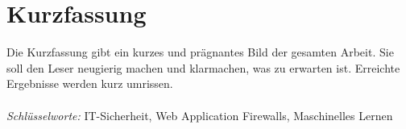 

\section*{Kurzfassung}
Die Kurzfassung gibt  ein kurzes und prägnantes Bild der  gesamten Arbeit. Sie soll
den  Leser  neugierig  machen  und  klarmachen,  was  zu  erwarten  ist.  Erreichte
Ergebnisse werden kurz umrissen.\\\\

\emph{Schlüsselworte:} IT-Sicherheit, Web Application Firewalls, Maschinelles Lernen


